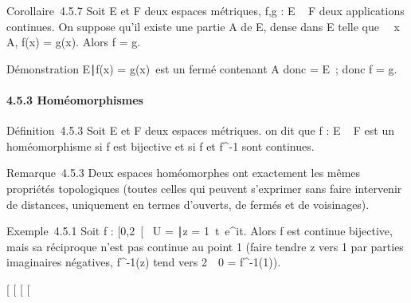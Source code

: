 \documentclass[]{article}
\begin{document}
Corollaire~4.5.7 Soit E et F deux espaces métriques, f,g : E \rightarrow~ F deux
applications continues. On suppose qu'il existe une partie A de E, dense
dans E telle que \forall~~x \in A, f(x) = g(x). Alors f
= g.

Démonstration \x \in E∣f(x) =
g(x)\ est un fermé contenant A donc
\overlineA = E~; donc f = g.

\paragraph{4.5.3 Homéomorphismes}

Définition~4.5.3 Soit E et F deux espaces métriques. on dit que f : E \rightarrow~
F est un homéomorphisme si f est bijective et si f et f^-1
sont continues.

Remarque~4.5.3 Deux espaces homéomorphes ont exactement les mêmes
propriétés topologiques (toutes celles qui peuvent s'exprimer sans faire
intervenir de distances, uniquement en termes d'ouverts, de fermés et de
voisinages).

Exemple~4.5.1 Soit f : [0,2\pi~[\rightarrow~ U = \z \in
{}∣z =
1\, t\mapsto~e^it. Alors
f est continue bijective, mais sa réciproque n'est pas continue au point
1 (faire tendre z vers 1 par parties imaginaires négatives,
f^-1(z) tend vers 2\pi~\neq~0 =
f^-1(1)).

[
[
[
[
\end{document}
